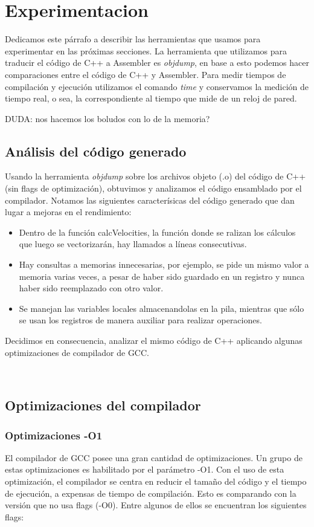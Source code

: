 \section{Experimentacion}

Dedicamos este párrafo a describir las herramientas que usamos para experimentar en las próximas secciones. La herramienta que utilizamos para traducir el código de C++ a Assembler es \textit{objdump}, en base a esto podemos hacer comparaciones entre el código de C++ y Assembler. Para medir tiempos de compilación y ejecución utilizamos el comando \textit{time} y conservamos la medición de tiempo real, o sea, la correspondiente al tiempo que mide de un reloj de pared.

\colorbox{BurntOrange}{DUDA: nos hacemos los boludos con lo de la memoria?}


\subsection{Análisis del código generado}

Usando la herramienta \textit{objdump} sobre los archivos objeto (.o) del código de C++ (sin flags de optimización), obtuvimos y analizamos el código ensamblado por el compilador. Notamos las siguientes caracterísicas del código generado que dan lugar a mejoras en el rendimiento:
\begin{itemize}
	\item Dentro de la función calcVelocities, la función donde se ralizan los cálculos que luego se vectorizarán, hay llamados a líneas consecutivas.
	\item Hay consultas a memorias innecesarias, por ejemplo, se pide un mismo valor a memoria varias veces, a pesar de haber sido guardado en un registro y nunca haber sido reemplazado con otro valor.
	\item Se manejan las variables locales almacenandolas en la pila, mientras que sólo se usan los registros de manera auxiliar para realizar operaciones.
\end{itemize}
Decidimos en consecuencia, analizar el mismo código de C++ aplicando algunas optimizaciones de compilador de GCC.

~\\

\subsection{Optimizaciones del compilador}


\subsubsection{Optimizaciones -O1}
El compilador de GCC posee una gran cantidad de optimizaciones. Un grupo de estas optimizaciones es habilitado por el parámetro -O1. Con el uso de esta optimización, el compilador se centra en reducir el tamaño del código y el tiempo de ejecución, a expensas de tiempo de compilación. Esto es comparando con la versión que no usa flags (-O0). Entre algunos de ellos se encuentran los siguientes flags:

